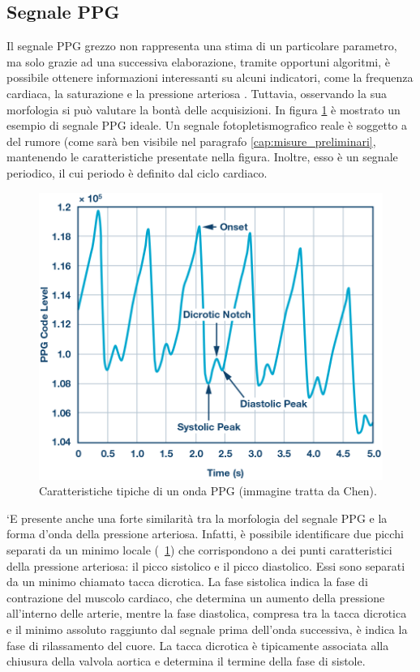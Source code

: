 \subsection{Segnale PPG}
Il segnale PPG grezzo non rappresenta una stima di un particolare parametro, ma solo grazie ad una successiva elaborazione, tramite opportuni algoritmi, è possibile ottenere informazioni interessanti su alcuni indicatori, come la frequenza cardiaca, la saturazione e la pressione arteriosa \cite{Foroozan2018}.
Tuttavia, osservando la sua morfologia si può valutare la bontà delle acquisizioni. In figura \ref{fig:Descrizione_Segnale_PPG} è mostrato un esempio di segnale PPG ideale. Un segnale fotopletismografico reale è soggetto a del rumore (come sarà ben visibile nel paragrafo \ref{cap:misure_preliminari}, mantenendo le caratteristiche presentate nella figura. Inoltre, esso è un segnale periodico, il cui periodo è definito dal ciclo cardiaco.
\begin{figure}[t]
	\centering
	\includegraphics[width=0.7\linewidth]{ImageFiles/Misure Preliminari/descrizione_segnale_ppg}
	\caption{Caratteristiche tipiche di un onda PPG (immagine tratta da Chen\cite{Ppgsignal}).}
	\label{fig:Descrizione_Segnale_PPG}
\end{figure}
`E presente anche una forte similarità tra la morfologia del segnale PPG e la forma d'onda della pressione arteriosa. Infatti, è possibile identificare due picchi separati da un minimo locale (\Fig~\ref{fig:Descrizione_Segnale_PPG}) che corrispondono a dei punti caratteristici della pressione arteriosa: il picco sistolico e il picco diastolico. Essi sono separati da un minimo chiamato tacca dicrotica. La fase sistolica indica la fase di contrazione del muscolo cardiaco, che determina un aumento della pressione all'interno delle arterie, mentre la fase diastolica, compresa tra la tacca dicrotica e il minimo assoluto raggiunto dal segnale prima dell'onda successiva, è indica la fase di rilassamento del cuore\cite{Singh2017}. La tacca dicrotica è tipicamente associata alla chiusura della valvola aortica e determina il termine della fase di sistole\cite{Gamrah2020}.


